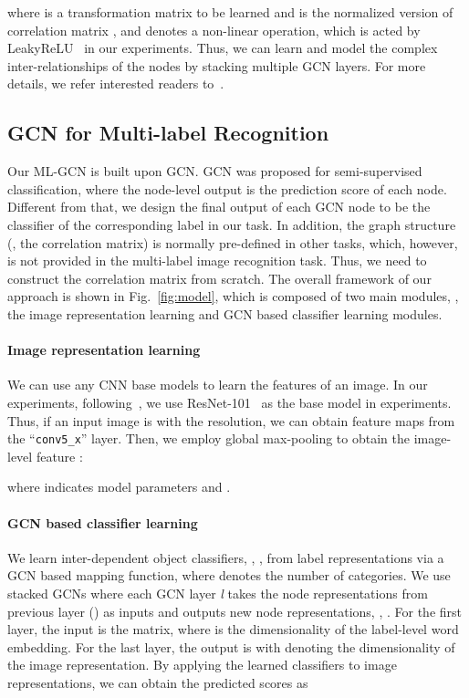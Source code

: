 \documentclass[10pt,twocolumn,letterpaper]{article}
\begin{document}
where  is a transformation matrix to be learned and  is the normalized version of correlation matrix , and  denotes a non-linear operation, which is acted by LeakyReLU~\cite{leakyrelu} in our experiments. Thus, we can learn and model the complex inter-relationships of the nodes by stacking multiple GCN layers. For more details, we refer interested readers to~\cite{gcn}.

\subsection{GCN for Multi-label Recognition}

Our ML-GCN is built upon GCN. GCN was proposed for semi-supervised classification, where the node-level output is the prediction score of each node. Different from that, we design the final output of each GCN node to be the classifier of the corresponding label in our task. In addition, the graph structure (\ie, the correlation matrix) is normally pre-defined in other tasks, which, however, is not provided in the multi-label image recognition task. Thus, we need to construct the correlation matrix from scratch. The overall framework of our approach is shown in Fig.~\ref{fig:model}, which is composed of two main modules, \ie, the image representation learning and GCN based classifier learning modules.



\paragraph{Image representation learning} We can use any CNN base models to learn the features of an image. In our experiments, following~\cite{srn,order,ml-zsl,multi_evidence}, we use ResNet-101~\cite{resnet} as the base model in experiments. Thus, if an input image  is with the  resolution, we can obtain  feature maps from the ``\texttt{conv5\_x}'' layer. Then, we employ global max-pooling to obtain the image-level feature :

where  indicates model parameters and .

\paragraph{GCN based classifier learning} We learn inter-dependent object classifiers, \ie, , from label representations via a GCN based mapping function, where  denotes the number of categories. We use stacked GCNs where each GCN layer \textit{l} takes the node representations from previous layer () as inputs and outputs new node representations, \ie, . For the first layer, the input is the  matrix, where  is the dimensionality of the label-level word embedding. For the last layer, the output is  with  denoting the dimensionality of the image representation. By applying the learned classifiers to image representations, we can obtain the predicted scores as
\end{document}
